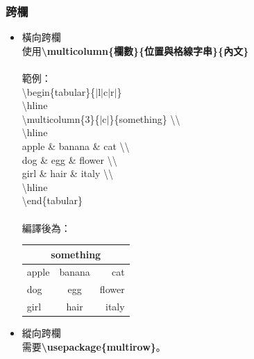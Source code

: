 \documentclass[12pt]{article}
\begin{document}
\begin{CJK*}{UTF8}{bsmi}
			\subsubsection{跨欄}
				\begin{itemize}
					\item 橫向跨欄 \\
						使用\textbf{\textbackslash multicolumn\{欄數\}\{位置與格線字串\}\{內文\}} \\ \\
						範例： \\
						\hspace*{2pc}\textbackslash begin\{tabular\}\{$\vert$l$\vert$c$\vert$r$\vert$\} \\
						\hspace*{4pc} \textbackslash hline \\
						\hspace*{4pc} \textbackslash multicolumn\{3\}\{$\vert$c$\vert$\}\{something\} \textbackslash \textbackslash \\
						\hspace*{4pc} \textbackslash hline \\
						\hspace*{4pc} apple \& banana \& cat \textbackslash \textbackslash \\
						\hspace*{4pc} dog \& egg \& flower \textbackslash \textbackslash \\
						\hspace*{4pc} girl \& hair \& italy \textbackslash \textbackslash \\
						\hspace*{4pc} \textbackslash hline \\
						\hspace*{2pc} \textbackslash end\{tabular\} \\ \\
						編譯後為：
						\begin{tabular}{|l|c|r|}
							\hline
							\multicolumn{3}{|c|}{something} \\
							\hline
							apple & banana & cat \\
							dog & egg & flower \\
							girl & hair & italy \\
							\hline
						\end{tabular}
					\item 縱向跨欄 \\
					需要\textbf{\textbackslash usepackage\{multirow\}}。 \\

\end{itemize}
\end{CJK*}
\end{document}
